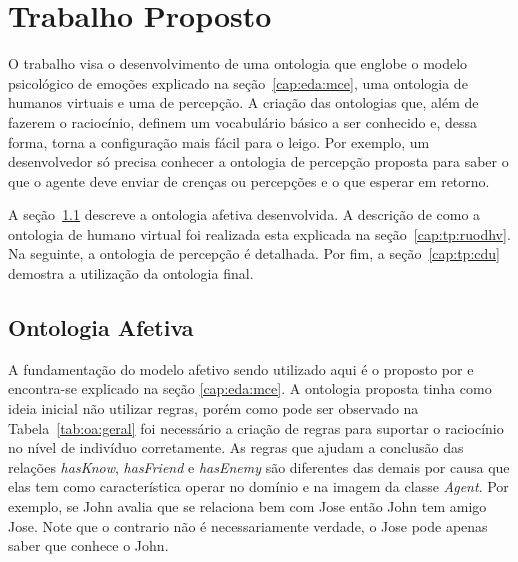 \chapter{Trabalho Proposto} \label{cap:tp}

O trabalho visa o desenvolvimento de uma ontologia que englobe o modelo
psicológico de emoções explicado na seção~\ref{cap:eda:mce}, uma ontologia de
humanos virtuais e uma de percepção. A criação das ontologias que, além de
fazerem o raciocínio, definem um vocabulário básico a ser conhecido e, dessa
forma, torna a configuração mais fácil para o leigo. Por exemplo, um
desenvolvedor só precisa conhecer a ontologia de percepção proposta para
saber\dev{} o que o agente deve enviar de crenças ou percepções e o que
esperar em retorno.


A seção~\ref{cap:tp:oa} descreve a ontologia afetiva desenvolvida. A descrição
de como a ontologia de humano virtual foi realizada esta explicada na
seção~\ref{cap:tp:ruodhv}. Na seguinte, a ontologia de percepção é detalhada.
Por fim, a seção~\ref{cap:tp:cdu} demostra a utilização da ontologia final.

\section{Ontologia Afetiva} \label{cap:tp:oa}

A fundamentação do modelo afetivo sendo utilizado aqui é o proposto por
\citet{ortony1988cse} e encontra-se explicado na seção \ref{cap:eda:mce}. A
ontologia proposta tinha como ideia inicial não utilizar regras, porém como
pode ser observado na Tabela~\ref{tab:oa:geral} foi necessário a criação de
regras para suportar o raciocínio no nível de indivíduo corretamente. As
regras que ajudam a conclusão das relações \emph{hasKnow}, \emph{hasFriend} e
\emph{hasEnemy} são diferentes das demais por causa que elas tem como
característica operar no domínio e na imagem da classe \emph{Agent}. Por
exemplo, se John avalia que se relaciona bem com Jose então John tem amigo
Jose. Note que o contrario não é necessariamente verdade, o Jose pode apenas
saber que conhece o John.

